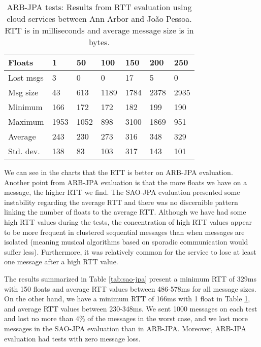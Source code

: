 \begin{table}[!ht]
\begin{center}
\begin{tabular}{|l|llllll|}
\hline 
Floats     & 1     & 50    & 100    & 150   & 200    & 250   \\
\hline
Lost msgs  & 3     & 0     & 0      & 17    & 5      & 0     \\
Msg size   & 43    & 613   & 1189   & 1784  & 2378   & 2935  \\
Minimum    & 166   & 172   & 172    & 182   & 199    & 190   \\
Maximum    & 1953  & 1052  & 898    & 3100  & 1869   & 951   \\
Average    & 243   & 230   & 273    & 316   & 348    & 329   \\
Std. dev.  & 138   & 83    & 103    & 317   & 143    & 101   \\
\hline
\end{tabular}
\end{center}

\caption{ARB-JPA tests: Results from RTT evaluation using cloud services between Ann Arbor and Jo\~{a}o Pessoa. RTT is in milliseconds and average message size is in bytes.}
 \label{tab:arb-jpa}
\end{table}

We can see in the charts that the RTT is better on ARB-JPA evaluation.
Another point from ARB-JPA evaluation is that the more floats we have on a message, the higher RTT we find.
The SAO-JPA evaluation presented some instability regarding the average RTT and there was no discernible pattern linking the number of floats to the average RTT.
Although we have had some high RTT values during the tests, the concentration of high RTT values appear to be more frequent in clustered sequential messages than when messages are isolated (meaning musical algorithms based on sporadic communication would suffer less). Furthermore, it was relatively common for the service to lose at least one message after a high RTT value.

The results summarized in Table \ref{tab:sao-jpa} present a minimum RTT of 329ms with 150 floats and average RTT values between 486-578ms for all message sizes.
On the other hand, we have a minimum RTT of 166ms with 1 float in Table \ref{tab:arb-jpa}, and average RTT values between 230-348ms.
We sent 1000 messages on each test and lost no more than 4\% of the messages in the worst case, and we lost more messages in the SAO-JPA evaluation than in ARB-JPA.
Moreover, ARB-JPA evaluation had tests with zero message loss.

